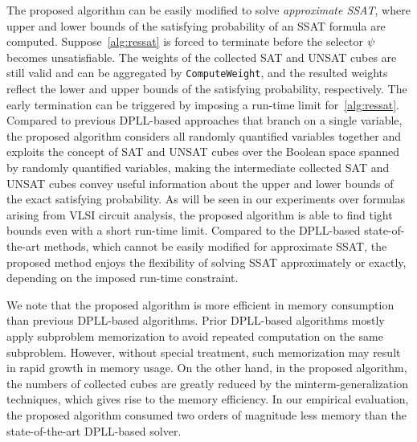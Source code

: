 The proposed algorithm can be easily modified to solve \textit{approximate SSAT},
where upper and lower bounds of the satisfying probability of an SSAT formula are computed.
Suppose~\cref{alg:ressat} is forced to terminate before the selector $\psi$ becomes unsatisfiable.
The weights of the collected SAT and UNSAT cubes are still valid and can be aggregated by \texttt{ComputeWeight},
and the resulted weights reflect the lower and upper bounds of the satisfying probability, respectively.
The early termination can be triggered by imposing a run-time limit for~\cref{alg:ressat}.
Compared to previous DPLL-based approaches that branch on a single variable,
the proposed algorithm considers all randomly quantified variables together and exploits the concept of SAT and UNSAT cubes over the Boolean space spanned by randomly quantified variables,
making the intermediate collected SAT and UNSAT cubes convey useful information about the upper and lower bounds of the exact satisfying probability.
As will be seen in our experiments over formulas arising from VLSI circuit analysis,
the proposed algorithm is able to find tight bounds even with a short run-time limit.
Compared to the DPLL-based state-of-the-art methods,
which cannot be easily modified for approximate SSAT,
the proposed method enjoys the flexibility of solving SSAT approximately or exactly,
depending on the imposed run-time constraint.

We note that the proposed algorithm is more efficient in memory consumption than previous DPLL-based algorithms.
Prior DPLL-based algorithms mostly apply subproblem memorization to avoid repeated computation on the same subproblem.
However, without special treatment, such memorization may result in rapid growth in memory usage.
On the other hand, in the proposed algorithm,
the numbers of collected cubes are greatly reduced by the minterm-generalization techniques,
which gives rise to the memory efficiency.
In our empirical evaluation,
the proposed algorithm consumed two orders of magnitude less memory than the state-of-the-art DPLL-based solver.

